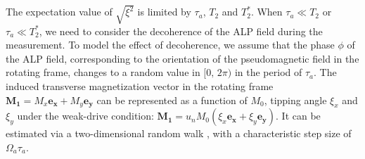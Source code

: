 \documentclass{WileyMSP-template}
\newcommand{\DB}[1]{\textcolor{blue}{#1}}
\newcommand{\DK}[1]{\textcolor{brown}{Derek: #1}}
\newcommand{\AS}[1]{\textcolor{red}{Alex: #1}}
\providecommand{\DIFaddend}{} %
\begin{document}
	\DIFaddend %
	The expectation value of $\sqrt{ \xi^2 }$ is limited by $\tau_a$, $T_2$ and $T_2^*$. 
	When $\tau_a \ll T_2$ or $\tau_a \ll T_2^*$, we need to consider the decoherence of the ALP field during the measurement. 
	To model the effect of decoherence, we assume that the phase $\phi$ of the ALP field, corresponding to the orientation of the pseudomagnetic field in the rotating frame, changes to a random value in $[0,\, 2\pi)$ in the period of $\tau_a$. The induced transverse magnetization vector in the rotating frame $\mathbf{M_1} = M_x\mathbf{e_x} + M_y\mathbf{e_y}$ can be represented as a function of $M_0$, tipping angle $\xi_x$ and $\xi_y$ under the weak-drive condition: $\mathbf{M_1} = u_n M_0 (\xi_x\mathbf{e_x} + \xi_y\mathbf{e_y})$. 
	It can be estimated via a two-dimensional random walk \cite{Loudon2000TheQT}, with a characteristic step size of $\Omega_a\tau_a$. 
\end{document}
